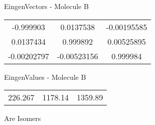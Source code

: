 \begin{multicols}{2}
\begin{center}
\vtab
 EingenVectors - Molecule B     \\
\vtab
\begin{tabular}{|c c c|}
-0.999903	 & 	0.0137538	 & 	-0.00195585	 \\
0.0137434	 & 	0.999892	 & 	0.00525895	 \\
-0.00202797	 & 	-0.00523156	 & 	0.999984
\end{tabular}

\vtab
 EingenValues - Molecule B     \\
\vtab
\begin{tabular}{|c c c|}
226.267	 & 	1178.14	 & 	1359.89
\end{tabular}

\end{center}
\end{multicols}
\begin{center}
\vtab
\vtab
\textcolor{NavyBlue}{\Large Are Isomers}
\end{center}
\newpage

